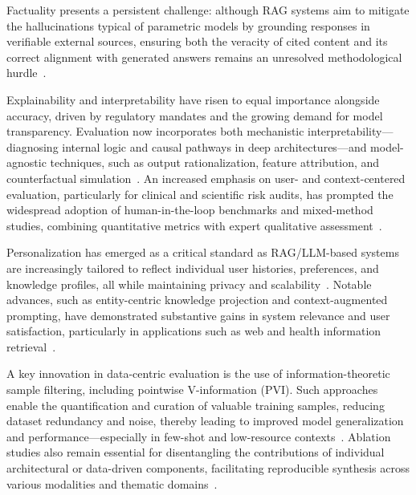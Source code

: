 \documentclass[sigconf]{acmart}
\begin{document}
Factuality presents a persistent challenge: although RAG systems aim to mitigate the hallucinations typical of parametric models by grounding responses in verifiable external sources, ensuring both the veracity of cited content and its correct alignment with generated answers remains an unresolved methodological hurdle~\cite{ref32,ref33,ref34,ref36,ref37,ref49,ref51,ref52,ref53,ref54,ref55,ref61,ref62,ref63,ref64}. 

Explainability and interpretability have risen to equal importance alongside accuracy, driven by regulatory mandates and the growing demand for model transparency. Evaluation now incorporates both mechanistic interpretability—diagnosing internal logic and causal pathways in deep architectures—and model-agnostic techniques, such as output rationalization, feature attribution, and counterfactual simulation~\cite{ref30,ref32,ref33,ref34,ref36,ref39,ref40,ref41,ref48,ref52,ref53,ref54,ref55,ref63,ref64}. An increased emphasis on user- and context-centered evaluation, particularly for clinical and scientific risk audits, has prompted the widespread adoption of human-in-the-loop benchmarks and mixed-method studies, combining quantitative metrics with expert qualitative assessment~\cite{ref8,ref10,ref22,ref25,ref27,ref29,ref39,ref53,ref54}.

Personalization has emerged as a critical standard as RAG/LLM-based systems are increasingly tailored to reflect individual user histories, preferences, and knowledge profiles, all while maintaining privacy and scalability~\cite{ref38,ref42,ref51,ref52,ref54,ref55,ref61,ref62}. Notable advances, such as entity-centric knowledge projection and context-augmented prompting, have demonstrated substantive gains in system relevance and user satisfaction, particularly in applications such as web and health information retrieval~\cite{ref51,ref55}.

A key innovation in data-centric evaluation is the use of information-theoretic sample filtering, including pointwise V-information (PVI). Such approaches enable the quantification and curation of valuable training samples, reducing dataset redundancy and noise, thereby leading to improved model generalization and performance—especially in few-shot and low-resource contexts~\cite{ref53,ref61,ref62}. Ablation studies also remain essential for disentangling the contributions of individual architectural or data-driven components, facilitating reproducible synthesis across various modalities and thematic domains~\cite{ref32,ref33,ref34,ref36,ref37,ref49,ref51,ref52,ref53,ref54,ref55,ref61,ref62,ref63,ref64}.
\end{document}
